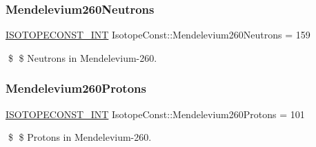 \subsubsection{\texorpdfstring{Mendelevium260\+Neutrons}{Mendelevium260Neutrons}}
{\footnotesize\ttfamily \mbox{\hyperlink{group___isotope_const-_macros_ga5f18360b3e99483a35c32d789e62621c}{I\+S\+O\+T\+O\+P\+E\+C\+O\+N\+S\+T\+\_\+\+I\+NT}} Isotope\+Const\+::\+Mendelevium260\+Neutrons = 159}

\$ \$ Neutrons in Mendelevium-\/260. \mbox{\label{group___isotope_const-_mendelevium-_md260_gaa46d9faa8165b6e204ff8bc4ac52a68c}} 
\subsubsection{\texorpdfstring{Mendelevium260\+Protons}{Mendelevium260Protons}}
{\footnotesize\ttfamily \mbox{\hyperlink{group___isotope_const-_macros_ga5f18360b3e99483a35c32d789e62621c}{I\+S\+O\+T\+O\+P\+E\+C\+O\+N\+S\+T\+\_\+\+I\+NT}} Isotope\+Const\+::\+Mendelevium260\+Protons = 101}

\$ \$ Protons in Mendelevium-\/260. 